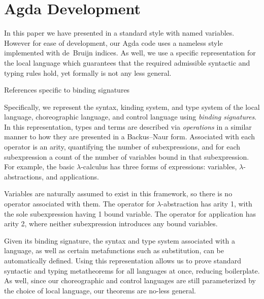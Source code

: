 \section{Agda Development}
\label{sec:agda-dev}

In this paper we have presented \langname in a standard style with named variables.
However for ease of development, our Agda code uses a nameless style implemented with de~Bruijn indices.
As well, we use a specific representation for the local language which guarantees that the required admissible syntactic and typing rules hold, yet formally is not any less general.

\todo References specific to binding signatures

Specifically, we represent the syntax, kinding system, and type system of the local language, choreographic language, and control language using \emph{binding signatures}.
In this representation, types and terms are described via \emph{operations} in a similar manner to how they are presented in a Backus–Naur form.
Associated with each operator is an arity, quantifying the number of subexpressions, and for each subexpression a count of the number of variables bound in that subexpression.
For example, the basic $\lambda$-calculus has three forms of expressions: variables, $\lambda$-abstractions, and applications.
\begin{syntax}
\end{syntax}
Variables are naturally assumed to exist in this framework, so there is no operator associated with them.
The operator for $\lambda$-abstraction has arity 1, with the sole subexpression having 1 bound variable.
The operator for application has arity 2, where neither subexpression introduces any bound variables.

Given its binding signature, the syntax and type system associated with a language, as well as certain metafunctions such as substitution, can be automatically defined.
Using this representation allows us to prove standard syntactic and typing metatheorems for all languages at once, reducing boilerplate.
As well, since our choreographic and control languages are still parameterized by the choice of local language, our theorems are no-less general.

